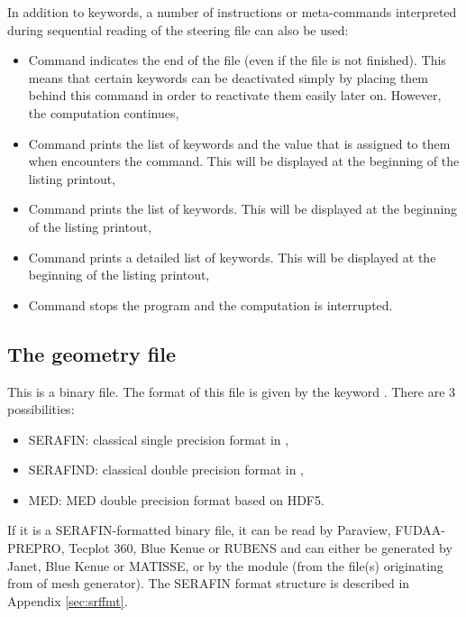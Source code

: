 
In addition to keywords, a number of instructions or meta-commands interpreted
during sequential reading of the steering file can also be used:

\begin{itemize}
\item Command  indicates the end of the file
(even if the file is not finished).
This means that certain keywords can be deactivated simply by placing them
behind this command in order to reactivate them easily later on.
However, the computation continues,

\item Command  prints the list of keywords and the value
that is assigned to them when \damo encounters the command.
This will be displayed at the beginning of the listing printout,

\item Command  prints the list of keywords.
This will be displayed at the beginning of the listing printout,

\item Command  prints a detailed list of keywords.
This will be displayed at the beginning of the listing printout,

\item Command  stops the program and the computation is
interrupted.
\end{itemize}


\subsection{The geometry file}

This is a binary file.
The format of this file is given by the keyword .
There are 3 possibilities:
\begin{itemize}
\item SERAFIN: classical single precision format in \tel,
\item SERAFIND: classical double precision format in \tel,
\item MED: MED double precision format based on HDF5.
\end{itemize}

If it is a SERAFIN-formatted binary file, it can be read by
Paraview, FUDAA-PREPRO, Tecplot 360, Blue Kenue or RUBENS
and can either be generated by Janet, Blue Kenue or MATISSE,
or by the \stbtel module (from the file(s) originating from of mesh generator).
The SERAFIN format structure is described in Appendix \ref{sec:srffmt}.

